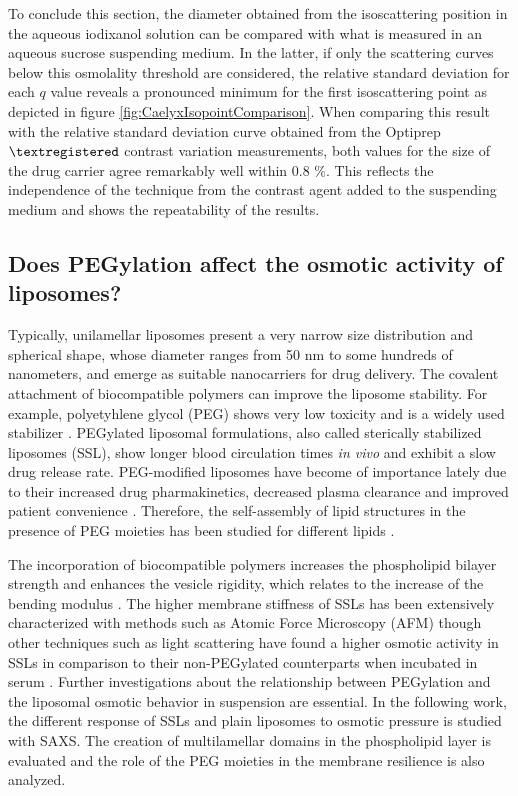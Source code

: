 To conclude this section, the diameter obtained from the isoscattering position in the aqueous iodixanol solution can be compared with what is measured in an aqueous sucrose suspending medium. In the latter, if only the scattering curves below this osmolality threshold are considered, the relative standard deviation for each $q$ value reveals a pronounced minimum for the first isoscattering point as depicted in figure \ref{fig:CaelyxIsopointComparison}. When comparing this result with the relative standard deviation curve obtained from the Optiprep $\textregistered$ contrast variation measurements, both values for the size of the drug carrier agree remarkably well within 0.8 $\%$. This reflects the independence of the technique from the contrast agent added to the suspending medium and shows the repeatability of the results.


\subsection{Does PEGylation affect the osmotic activity of liposomes?}
\label{sec:liposome_osmotic}

Typically, unilamellar liposomes present a very narrow size distribution and spherical shape, whose diameter ranges from 50 nm to some hundreds of nanometers, and emerge as suitable nanocarriers for drug delivery. The covalent attachment of biocompatible polymers can improve the liposome stability. For example, polyetyhlene glycol (PEG) shows very low toxicity \cite{yamaoka_distribution_1994} and is a widely used stabilizer \cite{sou_polyethylene_2000}. PEGylated liposomal formulations, also called sterically stabilized liposomes (SSL), show longer blood circulation times \emph{in vivo} \cite{barenholz_liposome_2001} and exhibit a slow drug release rate. PEG-modified liposomes have become of importance lately due to their increased drug pharmakinetics, decreased plasma clearance and improved patient convenience \cite{gabizon_polyethylene_1997,harris_effect_2003}. Therefore, the self-assembly of lipid structures in the presence of PEG moieties has been studied for different lipids \cite{lee_coarse-grained_2011}.

The incorporation of biocompatible polymers increases the phospholipid bilayer strength and enhances the vesicle rigidity, which relates to the increase of the bending modulus \cite{liang_effect_2005, sou_polyethylene_2000}. The higher membrane stiffness of SSLs has been extensively characterized with methods such as Atomic Force Microscopy (AFM) \cite{spyratou_atomic_2009} though other techniques such as light scattering have found a higher osmotic activity in SSLs in comparison to their non-PEGylated counterparts when incubated in serum \cite{wolfram_shrinkage_2014}. Further investigations about the relationship between PEGylation and the liposomal osmotic behavior in suspension are essential. In the following work, the different response of SSLs and plain liposomes to osmotic pressure is studied with SAXS. The creation of multilamellar domains in the phospholipid layer is evaluated and the role of the PEG moieties in the membrane resilience is also analyzed.

